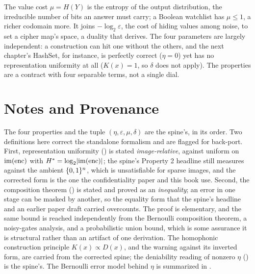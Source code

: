 The value cost $\mu = H(Y)$ is the entropy of the output distribution, the
irreducible number of bits an answer must carry; a Boolean watchlist has
$\mu \leq 1$, a richer codomain more. It joins $-\log_2 \varepsilon$, the
cost of hiding values among noise, to set a cipher map's space, a duality
that  derives. The four parameters are largely
independent: a construction can hit one without the others, and the next
chapter's HashSet, for instance, is perfectly correct ($\eta = 0$) yet has
no representation uniformity at all ($K(x) = 1$, so $\delta$ does not apply).
The properties are a contract with four separable terms, not a single dial.

\section{Notes and Provenance}
\label{sec:ch4-notes}

The four properties and the tuple $(\eta, \varepsilon, \mu, \delta)$ are the
spine's, in its order. Two definitions here correct the standalone
formalism and are flagged for back-port. First, representation uniformity
() is stated \emph{image-relative}, against uniform on
$\mathrm{im}(\operatorname{enc})$ with $H^{*} = \log_2\lvert\mathrm{im}(\operatorname{enc})\rvert$; the
spine's Property 2 headline still measures against the ambient $\{0,1\}^n$, which
is unsatisfiable for sparse images, and the corrected form is the one the
confidentiality paper and this book use. Second, the composition theorem
() is stated and proved as an \emph{inequality}; an
error in one stage can be masked by another, so the equality form that the
spine's headline and an earlier paper draft carried overcounts. The proof is
elementary, and the same bound is reached independently from the Bernoulli
composition theorem, a noisy-gates analysis, and a probabilistic union
bound, which is some assurance it is structural rather than an artifact of
one derivation. The homophonic construction principle $K(x) \propto D(x)$,
and the warning against its inverted form, are carried from the corrected
spine; the deniability reading of nonzero $\eta$ () is
the spine's. The Bernoulli error model behind $\eta$ is summarized in
.
